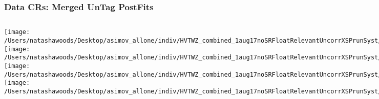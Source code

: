 \documentclass{beamer}
\begin{document}
\begin{frame}
\frametitle{Data CRs: Merged UnTag PostFits}
    \begin{columns}[t]

       \texttt{[image: /Users/natashawoods/Desktop/asimov\_allone/indiv/HVTWZ\_combined\_1aug17noSRFloatRelevantUncorrXSPrunSyst/L1\_MergHP\_GGF\_WZ\_UnTag\_TCR.pdf]}
       \texttt{[image: /Users/natashawoods/Desktop/asimov\_allone/indiv/HVTWZ\_combined\_1aug17noSRFloatRelevantUncorrXSPrunSyst/L1\_MergHP\_GGF\_WZ\_Tag\_WCR.pdf]}   
       \texttt{[image: /Users/natashawoods/Desktop/asimov\_allone/indiv/HVTWZ\_combined\_1aug17noSRFloatRelevantUncorrXSPrunSyst/L1\_MergLP\_GGF\_WZ\_UnTag\_TCR.pdf]}
       \texttt{[image: /Users/natashawoods/Desktop/asimov\_allone/indiv/HVTWZ\_combined\_1aug17noSRFloatRelevantUncorrXSPrunSyst/L1\_MergLP\_GGF\_WZ\_UnTag\_WCR.pdf]}   
       
       \texttt{[image: /Users/natashawoods/Desktop/asimov\_allone/indiv/HVTWZ\_combined\_1aug17noSRFloatRelevantUncorrXSSingleBinPrunSyst/L1\_MergHP\_GGF\_WZ\_UnTag\_TCR.pdf]}
       \texttt{[image: /Users/natashawoods/Desktop/asimov\_allone/indiv/HVTWZ\_combined\_1aug17noSRFloatRelevantUncorrXSSingleBinPrunSyst/L1\_MergHP\_GGF\_WZ\_UnTag\_WCR.pdf]}   
       \texttt{[image: /Users/natashawoods/Desktop/asimov\_allone/indiv/HVTWZ\_combined\_1aug17noSRFloatRelevantUncorrXSSingleBinPrunSyst/L1\_MergLP\_GGF\_WZ\_UnTag\_TCR.pdf]}
       \texttt{[image: /Users/natashawoods/Desktop/asimov\_allone/indiv/HVTWZ\_combined\_1aug17noSRFloatRelevantUncorrXSSingleBinPrunSyst/L1\_MergLP\_GGF\_WZ\_UnTag\_WCR.pdf]}   
\end{columns}
\end{frame}
\end{document}
